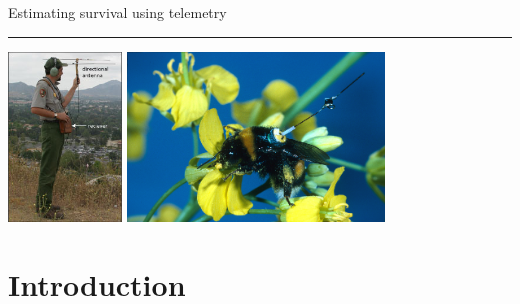 \documentclass[color=usenames,dvipsnames]{beamer}\usepackage[]{graphicx}\usepackage[]{color}
\begin{document}

\begin{frame}[plain]
  \begin{center}
    {\huge Estimating survival using telemetry \\ 
      }
    {\color{blue} \rule{\textwidth}{0.1pt}}
    \vfill
    \includegraphics[height=4.5cm,keepaspectratio]{figs/radiotelemetry} %
    \hspace{0.5cm}
      \includegraphics[height=4.5cm,keepaspectratio]{figs/bbee}
  \end{center}
\end{frame}




\section{Introduction}
\end{document}
